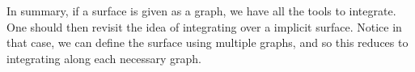                                    	In summary, if a surface is given as a graph, we have all the tools to integrate.  One should then revisit the idea of integrating over a implicit surface. Notice in that case, we can define the surface using multiple graphs, and so this reduces to integrating along each necessary graph.

